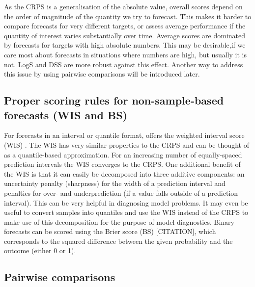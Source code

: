 \documentclass[article,shortnames]{jss}\usepackage[]{graphicx}\usepackage[]{color}
\begin{document}
As the CRPS is a generalisation of the absolute value, overall scores depend on the order of magnitude of the quantity we try to forecast. This makes it harder to compare forecasts for very different targets, or assess average performance if the quantity of interest varies substantially over time. Average scores are dominated by forecasts for targets with high absolute numbers. This may be desirable,if we care most about forecasts in situations where numbers are high, but usually it is not. LogS and DSS are more robust against this effect. Another way to address this issue by using pairwise comparisons will be introduced later. 

\subsection{Proper scoring rules for non-sample-based forecasts (WIS and BS)}
For forecasts in an interval or quantile format,  offers the weighted interval score (WIS) \citep{bracherEvaluatingEpidemicForecasts2021}. 
The WIS has very similar properties to the CRPS and can be thought of as a quantile-based approximation. For an increasing number of equally-spaced prediction intervals the WIS converges to the CRPS. One additional benefit of the WIS is that it can easily be decomposed into three additive components: an uncertainty penalty (sharpness) for the width of a prediction interval and penalties for over- and underprediction (if a value falls outside of a prediction interval). This can be very helpful in diagnosing model problems. It may even be useful to convert samples into quantiles and use the WIS instead of the CRPS to make use of this decomposition for the purpose of model diagnostics. 
Binary forecasts can be scored using the Brier score (BS) [CITATION], which corresponds to the squared difference between the given probability and the outcome (either 0 or 1). 

\subsection{Pairwise comparisons} 
\end{document}
